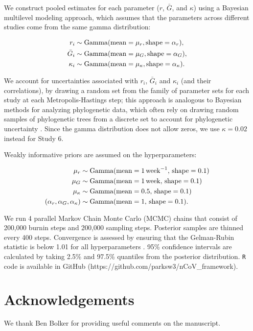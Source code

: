 \documentclass[12pt]{article}
\begin{document}
We construct pooled estimates for each parameter ($r$, $\bar G$, and $\kappa$) using a Bayesian multilevel modeling approach, which assumes that the parameters across different studies come from the same gamma distribution:
\begin{linenomath*}
\begin{equation}
\begin{aligned}
r_i &\sim \mathrm{Gamma}(\mathrm{mean}=\mu_r, \mathrm{shape}=\alpha_r),\\
\bar{G}_i &\sim \mathrm{Gamma}(\mathrm{mean}=\mu_G, \mathrm{shape}=\alpha_G),\\
\kappa_i &\sim \mathrm{Gamma}(\mathrm{mean}=\mu_\kappa, \mathrm{shape}=\alpha_\kappa).\\
\end{aligned}
\end{equation}
\end{linenomath*}
We account for uncertainties associated with $r_i$, $\bar G_i$ and $\kappa_i$ (and their correlations), by drawing a random set from the family of parameter sets for each study at each Metropolis-Hastings step;
this approach is analogous to Bayesian methods for analyzing phylogenetic data, which often rely on drawing random samples of phylogenetic trees from a discrete set to account for phylogenetic uncertainty \citep{pagel2004bayesian,bedford2014integrating}.
Since the gamma distribution does not allow zeros, we use $\kappa =0.02$ instead for Study 6.

Weakly informative priors are assumed on the hyperparameters:
\begin{linenomath*}
\begin{equation}
\begin{aligned}
\mu_r &\sim \mathrm{Gamma}(\mathrm{mean}=1\,\mathrm{week}^{-1},\,\mathrm{shape}=0.1)\\
\mu_G &\sim \mathrm{Gamma}(\mathrm{mean}=1\,\mathrm{week},\,\mathrm{shape}=0.1)\\
\mu_\kappa &\sim \mathrm{Gamma}(\mathrm{mean}=0.5,\,\mathrm{shape}=0.1)\\
(\alpha_r, \alpha_G, \alpha_\kappa) &\sim \mathrm{Gamma}(\mathrm{mean}=1,\,\mathrm{shape}=0.1).
\end{aligned}
\end{equation}
\end{linenomath*}
We run 4 parallel Markov Chain Monte Carlo (MCMC) chains that consist of 200,000 burnin steps and 200,000 sampling steps.
Posterior samples are thinned every 400 steps.
Convergence is assessed by ensuring that the Gelman-Rubin statistic is below 1.01 for all hyperparameters \citep{gelman1992inference}.
95\% confidence intervals are calculated by taking 2.5\% and 97.5\% quantiles from the posterior distribution.
\texttt{R} code is available in GitHub (https://github.com/parksw3/nCoV\_framework).

\section*{Acknowledgements}

We thank Ben Bolker for providing useful comments on the manuscript.

\pagebreak


\end{document}
